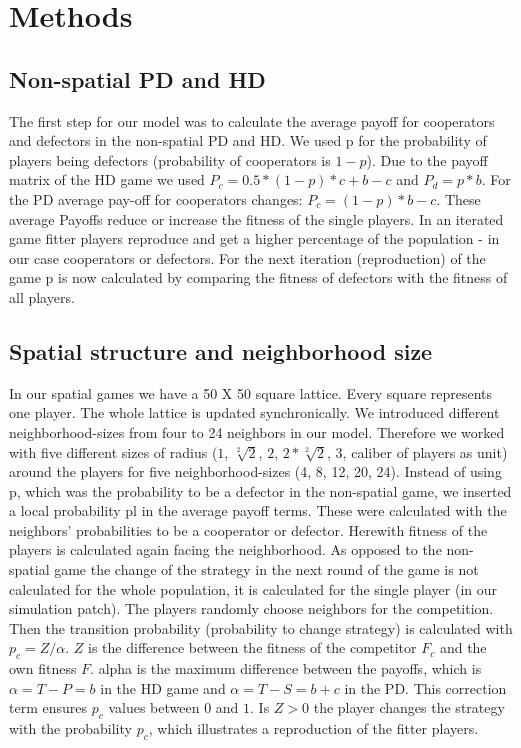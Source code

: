 \section{Methods}


\subsection{Non-spatial PD and HD}

The first step for our model was to calculate the average payoff for cooperators and defectors in the non-spatial PD and HD. We used p for the probability of players being defectors (probability of cooperators is $1-p$). Due to the payoff matrix of the HD game we used $P_{c}=0.5*(1-p)*c+b-c$ and $P_{d}=p*b$. For the PD average pay-off for cooperators changes: $P_{c}=(1-p)*b-c$. These average Payoffs reduce or increase the fitness of the single players. In an iterated game fitter players reproduce and get a higher percentage of the population - in our case cooperators or defectors. For the next iteration (reproduction) of the game p is now calculated by comparing the fitness of defectors with the fitness of all players.
 
\subsection{Spatial structure and neighborhood size}
In our spatial games we have a 50 X 50 square lattice. Every square represents one player. The whole lattice is updated synchronically. We introduced different neighborhood-sizes from four to 24 neighbors in our model. Therefore we worked with five different sizes of radius ($1$, $\sqrt[2]{2}$, $2$, $2*\sqrt[2]{2}$, $3$, caliber of players as unit) around the players for five neighborhood-sizes (4, 8, 12, 20, 24). Instead of using p, which was the probability to be a defector in the non-spatial game, we inserted a local probability pl in the average payoff terms. These were calculated with the neighbors' probabilities to be a cooperator or defector. Herewith fitness of the players is calculated again facing the neighborhood. As opposed to the non-spatial game the change of the strategy in the next round of the game is not calculated for the whole population, it is calculated for the single player (in our simulation patch). The players randomly choose neighbors for the competition. Then the transition probability (probability to change strategy) is calculated with $p_{c} = Z/\alpha$. $Z$ is the difference between the fitness of the competitor $F_c$ and the own fitness $F$. alpha is the maximum difference between the payoffs, which is $\alpha=T-P=b$ in the HD game and $\alpha=T-S=b+c$ in the PD. This correction term ensures $p_{c}$ values between $0$ and $1$. Is $Z>0$ the player changes the strategy with the probability $p_{c}$, which illustrates a reproduction of the fitter players.

